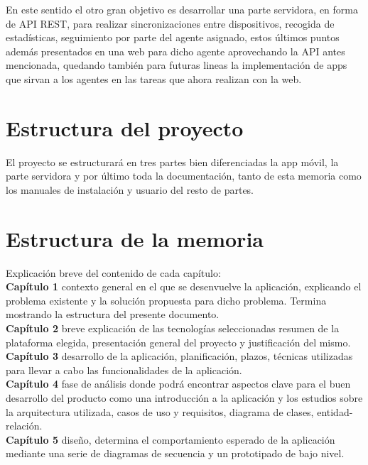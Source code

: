 \documentclass[../pfc.tex]{subfiles}
\begin{document}
En este sentido el otro gran objetivo es desarrollar una parte servidora, en forma de API REST, para realizar sincronizaciones entre dispositivos, recogida de estadísticas, seguimiento por parte del agente asignado, estos últimos puntos además presentados en una web para dicho agente aprovechando la API antes mencionada, quedando también para futuras lineas la implementación de apps que sirvan a los agentes en las tareas que ahora realizan con la web.\\

\section{Estructura del proyecto}

El proyecto se estructurará en tres partes bien diferenciadas la app móvil, la parte servidora y por último toda la documentación, tanto de esta memoria como los manuales de instalación y usuario del resto de partes. 

\section{Estructura de la memoria}

Explicación breve del contenido de cada capítulo:\\

  \textbf{Capítulo 1} contexto general en el que se desenvuelve la aplicación, explicando el problema existente y la solución propuesta para dicho problema. Termina mostrando la estructura del presente documento.\\
  
  \textbf{Capítulo 2} breve explicación de las tecnologías seleccionadas resumen de la plataforma elegida, presentación general del proyecto y justificación del mismo.\\
  
  \textbf{Capítulo 3} desarrollo de la aplicación, planificación, plazos, técnicas utilizadas para llevar a cabo las funcionalidades de la aplicación.\\
  
  \textbf{Capítulo 4} fase de análisis donde podrá encontrar aspectos clave para el buen desarrollo del producto como una introducción a la aplicación y los estudios sobre la arquitectura utilizada, casos de uso y requisitos, diagrama de clases, entidad-relación.\\
  
  \textbf{Capítulo 5} diseño, determina el comportamiento esperado de la aplicación mediante una serie de diagramas de secuencia y un prototipado de bajo nivel.\\
  
\end{document}
